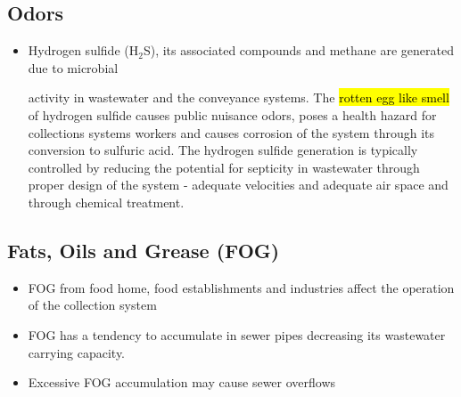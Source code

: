 \subsection{Odors}
\begin{itemize}
\item Hydrogen sulfide (H$_2$S), its associated compounds and methane are generated due to microbial

 activity in wastewater and the conveyance systems.  The \hl{rotten egg like smell} of hydrogen sulfide causes public nuisance odors, poses a health hazard for collections systems workers and causes corrosion of the system through its conversion to sulfuric acid.  The hydrogen sulfide generation is typically controlled by reducing the potential for septicity in wastewater through proper design of the system -  adequate velocities and adequate air space and through chemical treatment.
 \end{itemize}

\subsection{Fats, Oils and Grease (FOG)}
\begin{itemize}
\item FOG from food home, food establishments and industries affect the operation of the collection system
\item FOG has a tendency to accumulate in sewer pipes decreasing its wastewater carrying capacity.
\item Excessive FOG accumulation may cause sewer overflows
 \end{itemize}
 
 
 
 \newpage
